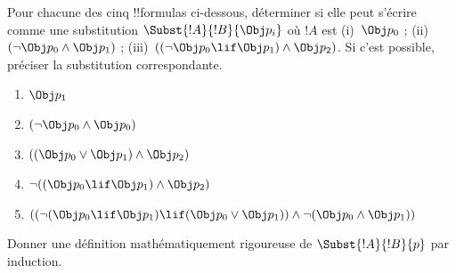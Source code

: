 \documentclass[../../../include/open-logic-section]{subfiles}
\begin{document}
\begin{prob}
Pour chacune des cinq !!{formula}s ci-dessous, déterminer si elle
peut s'écrire comme une substitution \(\Subst{!A}{!B}{\Obj p_i}\)
où \(!A\) est (i)~\(\Obj p_0\) ; (ii)~\((\lnot \Obj p_0 \land \Obj
p_1)\) ; (iii)~\(((\lnot \Obj p_0 \lif \Obj p_1) \land \Obj
p_2)\). Si c'est possible, préciser la substitution correspondante.
  \begin{enumerate}
    \item \(\Obj p_1\)
    \item \((\lnot \Obj p_0 \land \Obj p_0)\)
    \item \(((\Obj p_0 \lor \Obj p_1) \land \Obj p_2)\)
    \item \(\lnot ((\Obj p_0 \lif \Obj p_1) \land \Obj p_2)\)
    \item \(((\lnot (\Obj p_0 \lif \Obj p_1) \lif (\Obj p_0 \lor \Obj p_1)) \land \lnot (\Obj p_0 \land \Obj p_1))\)
  \end{enumerate}
\end{prob}

\begin{prob}
Donner une définition mathématiquement rigoureuse de $\Subst{!A}{!B}{p}$
par induction.
\end{prob}
\end{document}
